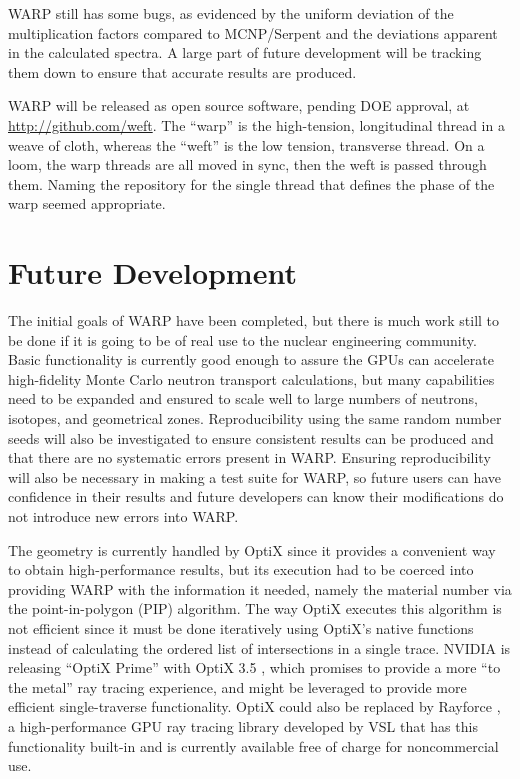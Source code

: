 \documentclass[preprint,12pt]{elsarticle}
\begin{document}
WARP still has some bugs, as evidenced by the uniform deviation of the multiplication factors compared to MCNP/Serpent and the deviations apparent in the calculated spectra.  A large part of future development will be tracking them down to ensure that accurate results are produced.

WARP will be released as open source software, pending DOE approval, at \url{http://github.com/weft}. The ``warp'' is the high-tension, longitudinal thread in a weave of cloth, whereas the ``weft'' is the low tension, transverse thread.  On a loom, the warp threads are all moved in sync, then the weft is passed through them.  Naming the repository for the single thread that defines the phase of the warp seemed appropriate.

\section{Future Development}
\label{sec:dev}

The initial goals of WARP have been completed, but there is much work still to be done if it is going to be of real use to the nuclear engineering community.  Basic functionality is currently good enough to assure the GPUs can accelerate high-fidelity Monte Carlo neutron transport calculations, but many capabilities need to be expanded and ensured to scale well to large numbers of neutrons, isotopes, and geometrical zones.  Reproducibility using the same random number seeds will also be investigated to ensure consistent results can be produced and that there are no systematic errors present in WARP.  Ensuring reproducibility will also be necessary in making a test suite for WARP, so future users can have confidence in their results and future developers can know their modifications do not introduce new errors into WARP.

The geometry is currently handled by OptiX since it provides a convenient way to obtain high-performance results, but its execution had to be coerced into providing WARP with the information it needed, namely the material number via the point-in-polygon (PIP) algorithm.  The way OptiX executes this algorithm is not efficient since it must be done iteratively using OptiX's native functions instead of calculating the ordered list of intersections in a single trace.  NVIDIA is releasing ``OptiX Prime'' with OptiX 3.5 \cite{optix3.5}, which promises to provide a more ``to the metal'' ray tracing experience, and might be leveraged to provide more efficient single-traverse functionality.  OptiX could also be replaced by Rayforce \cite{rayforce}, a high-performance GPU ray tracing library developed by VSL that has this functionality built-in and is currently available free of charge for noncommercial use.
\end{document}
